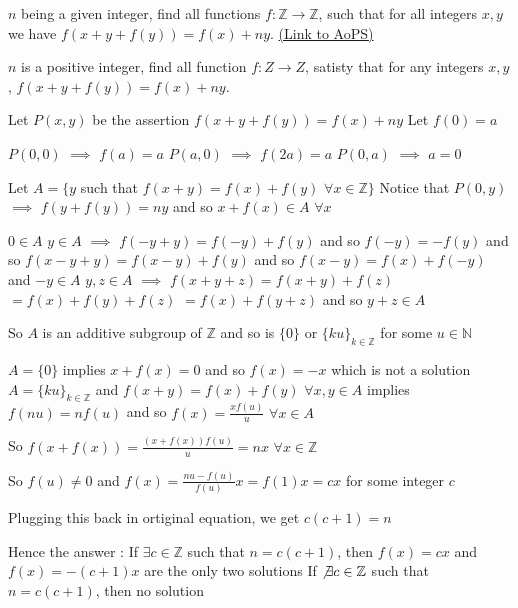 \begin{problem}
	$n$ being a given integer, find all functions $f: \mathbb{Z} \to \mathbb{Z}$, such that for all integers $x,y$ we have $f\left( {x + y + f(y)} \right) = f(x) + ny$.
	\flushright \href{https://artofproblemsolving.com/community/c6h469660}{(Link to AoPS)}
\end{problem}



\begin{solution}
	\begin{tcolorbox}$n$ is a positive integer, find all function $f:Z \to Z$, satisty that for any integers $x,y$, $f\left( {x + y + f(y)} \right) = f(x) + ny$.\end{tcolorbox}
Let $P(x,y)$ be the assertion $f(x+y+f(y))=f(x)+ny$
Let $f(0)=a$

$P(0,0)$ $\implies$ $f(a)=a$
$P(a,0)$ $\implies$ $f(2a)=a$ 
$P(0,a)$ $\implies$ $a=0$

Let $A=\{y$ such that $f(x+y)=f(x)+f(y)$ $\forall x\in\mathbb Z\}$
Notice that $P(0,y)$ $\implies$ $f(y+f(y))=ny$ and so $x+f(x)\in A$ $\forall x$

$0\in A$
$y\in A$ $\implies$ $f(-y+y)=f(-y)+f(y)$ and so $f(-y)=-f(y)$ and so $f(x-y+y)=f(x-y)+f(y)$ and so $f(x-y)=f(x)+f(-y)$ and $-y\in A$
$y,z\in A$ $\implies$ $f(x+y+z)=f(x+y)+f(z)$ $=f(x)+f(y)+f(z)$ $=f(x)+f(y+z)$ and so $y+z\in A$

So $A$ is an additive subgroup of $\mathbb Z$ and so is $\{0\}$ or $\{ku\}_{k\in\mathbb Z}$ for some $u\in\mathbb N$

$A=\{0\}$ implies $x+f(x)=0$ and so $f(x)=-x$ which is not a solution
$A=\{ku\}_{k\in\mathbb Z}$ and $f(x+y)=f(x)+f(y)$ $\forall x,y\in A$ implies $f(nu)=nf(u)$ and so $f(x)=\frac{xf(u)}u$ $\forall x\in A$

So $f(x+f(x))=\frac{(x+f(x))f(u)}u=nx$ $\forall x\in\mathbb Z$

So $f(u)\ne 0$ and $f(x)=\frac{nu-f(u)}{f(u)}x=f(1)x=cx$ for some integer $c$

Plugging this back in ortiginal equation, we get $c(c+1)=n$

Hence the answer :
If $\exists c\in\mathbb Z$ such that $n=c(c+1)$, then $f(x)=cx$ and $f(x)=-(c+1)x$ are the only two solutions
If $\not\exists c\in\mathbb Z$ such that $n=c(c+1)$, then no solution
\end{solution}



